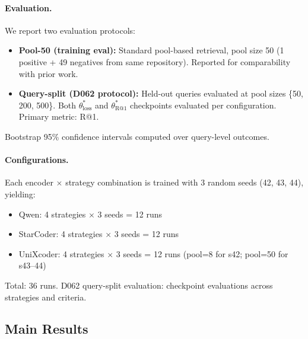 \paragraph{Evaluation.}
We report two evaluation protocols:
\begin{itemize}
\item \textbf{Pool-50 (training eval):} Standard pool-based retrieval, pool size 50 (1 positive + 49 negatives from same repository). Reported for comparability with prior work.
\item \textbf{Query-split (D062 protocol):} Held-out queries evaluated at pool sizes \{50, 200, 500\}. Both $\theta^*_{\text{loss}}$ and $\theta^*_{\text{R@1}}$ checkpoints evaluated per configuration. Primary metric: R@1.
\end{itemize}
Bootstrap 95\% confidence intervals computed over query-level outcomes.

\paragraph{Configurations.}
Each encoder $\times$ strategy combination is trained with 3 random seeds (42, 43, 44), yielding:
\begin{itemize}
\item Qwen: 4 strategies $\times$ 3 seeds = 12 runs
\item StarCoder: 4 strategies $\times$ 3 seeds = 12 runs
\item UniXcoder: 4 strategies $\times$ 3 seeds = 12 runs (pool=8 for s42; pool=50 for s43--44)
\end{itemize}
Total: 36 runs. D062 query-split evaluation:  checkpoint evaluations across strategies and criteria.


\subsection{Main Results}
\label{sec:results}



